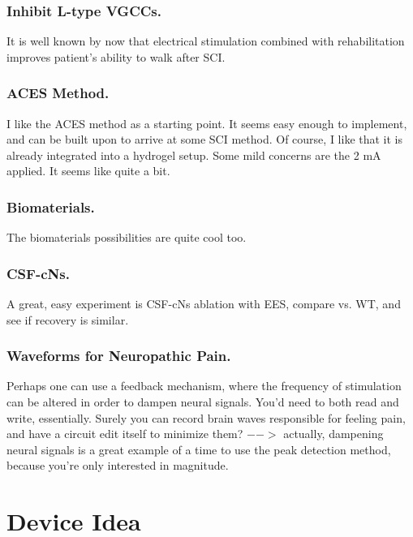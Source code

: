 \documentclass[12pt]{report}
\begin{document}
\subsubsection{Inhibit L-type VGCCs.}
It is well known by now that electrical stimulation combined with rehabilitation improves patient's ability to walk after SCI. 

\subsubsection{ACES Method.}

I like the ACES method as a starting point. It seems easy enough to implement, and can be built upon to arrive at some SCI method. Of course, I like that it is already integrated into a hydrogel setup. Some mild concerns are the 2 mA applied. It seems like quite a bit. 

\subsubsection{Biomaterials.}

The biomaterials possibilities are quite cool too. 

\subsubsection{CSF-cNs.}

A great, easy experiment is CSF-cNs ablation with EES, compare vs. WT, and see if recovery is similar.  


\subsubsection{Waveforms for Neuropathic Pain.}
Perhaps one can use a feedback mechanism, where the frequency of stimulation can be altered in order to dampen neural signals. You'd need to both read and write, essentially. Surely you can record brain waves responsible for feeling pain, and have a circuit edit itself to minimize them? $-->$ actually, dampening neural signals is a great example of a time to use the peak detection method, because you're only interested in magnitude. 

\section{Device Idea}
\end{document}
